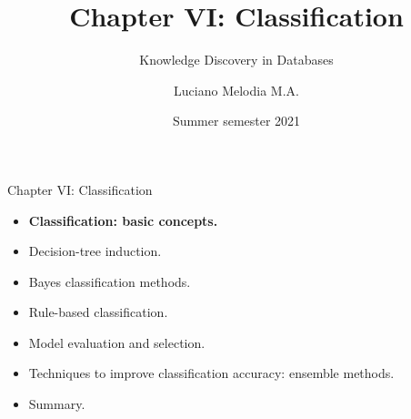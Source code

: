 \documentclass[aspectratio=169,t,table]{beamer}
\title[KDD]{Chapter VI: Classification}
\subtitle{Knowledge Discovery in Databases}
\author[L.~Melodia]{Luciano Melodia M.A.}
\institute[Department]{Evolutionary Data Management, Friedrich-Alexander University Erlangen-Nürnberg}
\date{Summer semester 2021}
\begin{document}
  \maketitle

  {
    \begin{frame}{Chapter VI: Classification}
        \begin{itemize}
            \item \textbf{Classification: basic concepts.}
            \item Decision-tree induction.
            \item Bayes classification methods.
            \item Rule-based classification.
            \item Model evaluation and selection.
            \item Techniques to improve classification accuracy: ensemble methods.
            \item Summary.
        \end{itemize}
    \end{frame}
  }
\end{document}
